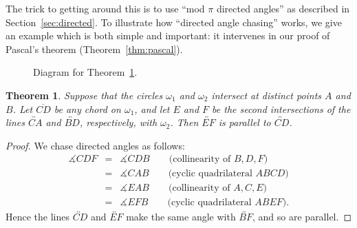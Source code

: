 \documentclass[12pt]{book}
\numberwithin{exc}{section}
\numberwithin{figure}{section}
\newtheorem{theorem}{Theorem}[section]
\numberwithin{equation}{theorem}
\def\beqa{\begin{eqnarray*}}
\def\eeqa{\end{eqnarray*}}
\def\dang{\measuredangle} %
\def\line#1{\overleftrightarrow{#1}}
\def\seg#1{\overline{#1}}
\begin{document}
The trick to getting around this is to use ``mod $\pi$ directed angles''
 
as described in Section~\ref{sec:directed}. To illustrate how
``directed angle chasing'' works, we give an example which is both simple
and important: it intervenes in our proof of
Pascal's theorem (Theorem~\ref{thm:pascal}). 
\begin{figure}[ht]
\caption{Diagram for Theorem~\ref{thm:parchord}.}
\end{figure}
\begin{theorem} \label{thm:parchord}
Suppose that the circles $\omega_1$ and $\omega_2$ intersect at
distinct points $A$ and $B$.
 Let $\seg{CD}$ be any chord on $\omega_{1}$, and let $E$ and 
$F$ be the second intersections of the lines $\line{CA}$ and $\line{BD}$, 
respectively, with $\omega_{2}$. Then $\line{EF}$ is parallel to $\line{CD}$.
\end{theorem}
\begin{proof}
We chase directed angles as follows:
\beqa
\dang CDF &=& \dang CDB \qquad \mbox{(collinearity of $B,D,F$)} \\
&=& \dang CAB \qquad \mbox{(cyclic quadrilateral $ABCD$)} \\
&=& \dang EAB \qquad \mbox{(collinearity of $A,C,E$)} \\
&=& \dang EFB \qquad \mbox{(cyclic quadrilateral $ABEF$)}.
\eeqa
Hence the lines $\line{CD}$ and $\line{EF}$ make the same angle with $\line{BF}$, 
and so are parallel.
\end{proof}
\end{document}
